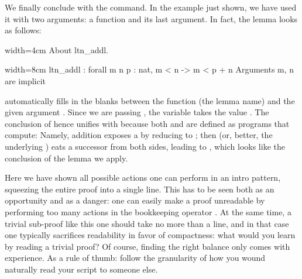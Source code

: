 We finally conclude with the  command. In the example just
shown, we have used it with two arguments: a function and its last
argument. In fact, the lemma  looks as follows:

\begin{coq-left}{}{width=4cm}
About ltn_addl.
$~$
$~$
\end{coq-left}
\begin{coqout-right}{}{width=8cm}
ltn_addl : forall m n p : nat,
  m < n -> m < p + n
Arguments m, n are implicit
\end{coqout-right}

 automatically fills in the blanks between the function
(the lemma name) and the given argument .
Since we are passing , the
variable  takes the value .  The conclusion of 
hence unifies with  because both \C{+} and \C{<} are
defined as programs that compute: Namely, addition exposes a  by
reducing to ; then \C{<} (or, better, the underlying
\C{<=}) eats a successor from both sides, leading to ,
which looks like the conclusion of the lemma we apply.

Here we have shown all possible actions one can perform in an intro
pattern, squeezing the entire proof into a single line.  This has
to be seen both as an opportunity and as a danger: one can easily
make a proof unreadable by performing too many actions in the bookkeeping
operator \C{=>}.  At the same time, a trivial sub-proof like this one
should take no more than a line, and in that case one typically
sacrifices readability in favor of compactness: what would you learn by
reading a trivial proof?  Of course,
finding the right balance only comes with experience. As a rule
of thumb: follow the granularity of how you wound naturally
read your script to someone else.


%

